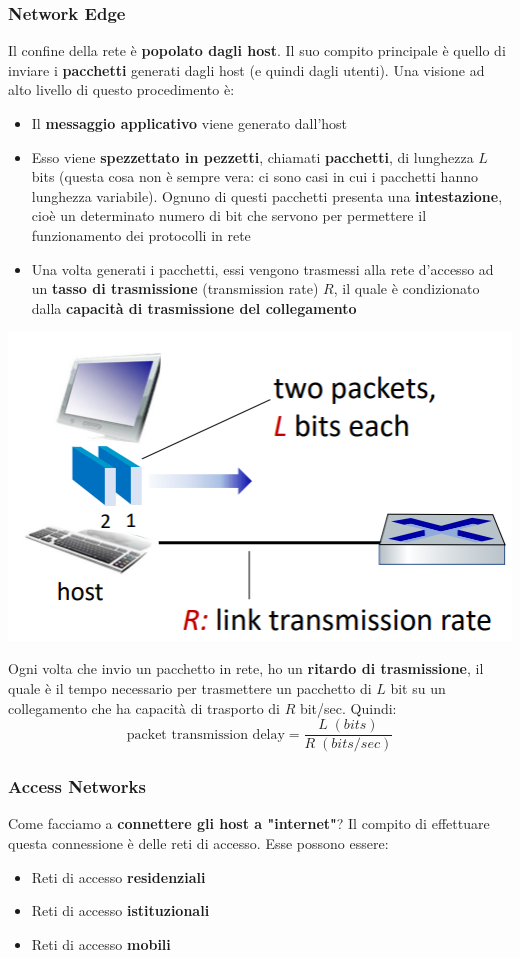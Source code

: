 \documentclass[12pt]{article}
\begin{document}
\subsubsection{Network Edge}
Il confine della rete è \textbf{popolato dagli host}. Il suo compito principale è quello di inviare i \textbf{pacchetti}
generati dagli host (e quindi dagli utenti). Una visione ad alto livello di questo procedimento è:
\begin{itemize}
    \item Il \textbf{messaggio applicativo} viene generato dall'host
    \item Esso viene \textbf{spezzettato in pezzetti}, chiamati \textbf{pacchetti}, di lunghezza $L$ bits (questa cosa non è sempre vera: ci sono casi in cui i pacchetti hanno lunghezza variabile).
    Ognuno di questi pacchetti presenta una \textbf{intestazione}, cioè un determinato numero di bit che servono per permettere il funzionamento dei protocolli in rete
    \item Una volta generati i pacchetti, essi vengono trasmessi alla rete d'accesso ad un \textbf{tasso di trasmissione} (transmission rate) $R$, il quale è condizionato dalla \textbf{capacità di trasmissione del collegamento}
\end{itemize}
\begin{center}
    \includegraphics[width = 0.50\linewidth]{Images/4.PNG}
\end{center}
Ogni volta che invio un pacchetto in rete, ho un \textbf{ritardo di trasmissione}, il quale è il tempo necessario per trasmettere un pacchetto di $L$ bit su un collegamento che
ha capacità di trasporto di $R$ bit/sec. Quindi:
$$\textrm{packet transmission delay} = \frac{L \; (bits)}{R \; (bits/sec)}$$
\subsubsection{Access Networks}
Come facciamo a \textbf{connettere gli host a "internet"}? Il compito di effettuare questa connessione è delle
reti di accesso. Esse possono essere:
\begin{itemize}
    \item Reti di accesso \textbf{residenziali}
    \item Reti di accesso \textbf{istituzionali}
    \item Reti di accesso \textbf{mobili}
\end{itemize}
\end{document}
